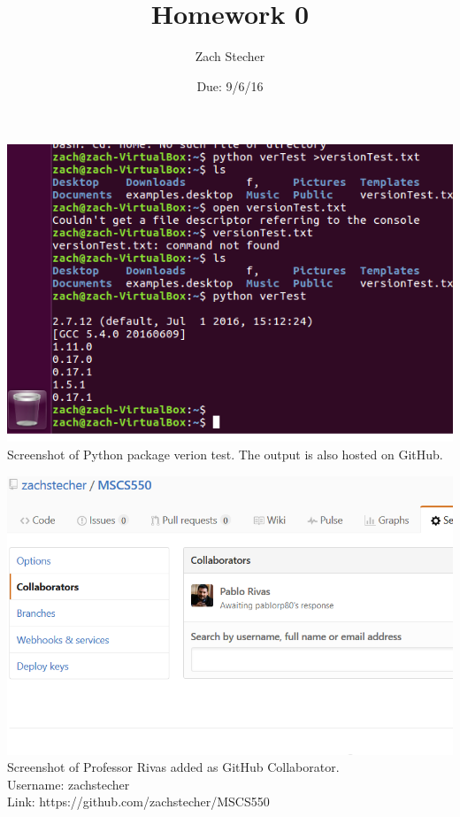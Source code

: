 \documentclass [12pt] {article}
\begin{document}
\title{Homework 0}
\author {Zach Stecher}
\date{Due: 9/6/16}
\maketitle

\includegraphics{ScreenShot}
Screenshot of Python package verion test. The output is also hosted on GitHub.

\includegraphics{Collab}
Screenshot of Professor Rivas added as GitHub Collaborator.\\
Username: zachstecher\\
Link: https://github.com/zachstecher/MSCS550
\end{document}
